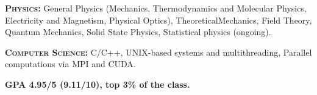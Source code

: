 \begin{cventries}
{\begin{cvitems}
        \item {\textsc{\textbf{Physics:}} General Physics (Mechanics, \hspace{5pt} Thermodynamics and Molecular Physics, \hspace{5pt} Electricity and Magnetism, \hspace{5pt} Physical Optics), \hspace{5pt} Theoretical\hspace{2pt}Mechanics, \hspace{5pt} Field Theory, \hspace{10pt} \textsf{Quantum Mechanics}, \hspace{10pt} \textsf{Solid State Physics}, \hspace{10pt} \textsf{Statistical physics (ongoing)}.}
        \item {\textsc{\textbf{Computer Science:}} \hspace{5pt}  C/C++, \hspace{5pt} UNIX-based systems and multithreading, \hspace{5pt} Parallel computations via \textsf{MPI and CUDA}.}
		\item {\textbf{GPA 4.95/5 (9.11/10), top 3\% of the class.}}        
      \end{cvitems}
    }

\end{cventries}
